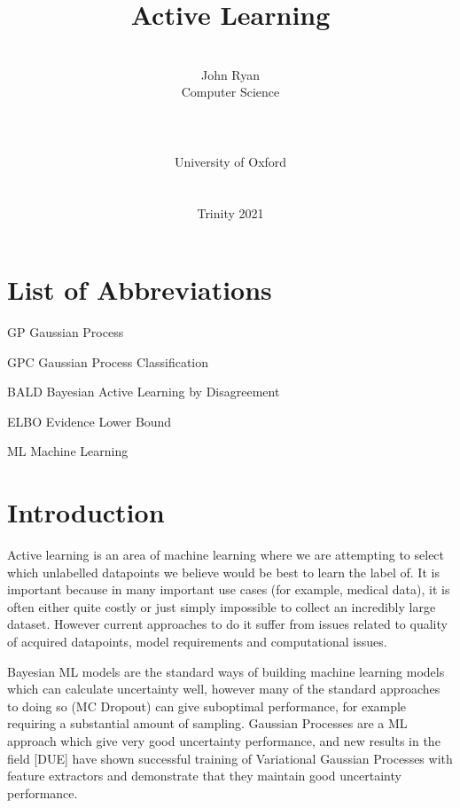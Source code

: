 \documentclass[12pt, a4paper]{report}
\date{}
\title{Active Learning}
\author{\\ \Large{John Ryan}
\\ Computer Science
\\
\\
\\
\\ University of Oxford
\\
\\ \\
Trinity 2021
}
\theoremstyle{definition}
\theoremstyle{definition}
\theoremstyle{definition}
\begin{document}

\thispagestyle{headings}
	\maketitle
\FloatBarrier
{}


\thispagestyle{empty}
\begin{abstract}



\end{abstract}
\tableofcontents
\thispagestyle{plain}
\listoffigures
\listoftables
\listofalgocfs
\listoftheorems
\chapter*{List of Abbreviations}
\begin{abbreviations}
    \item[GP] Gaussian Process
    \item[GPC] Gaussian Process Classification
    \item[BALD] Bayesian Active Learning by Disagreement
    \item[ELBO] Evidence Lower Bound
    \item[ML] Machine Learning
\end{abbreviations}

\chapter{Introduction}

Active learning is an area of machine learning where we are attempting to select which unlabelled datapoints we believe would be best to learn the label of. It is important because in many important use cases (for example, medical data), it is often either quite costly or just simply impossible to collect an incredibly large dataset. However current approaches to do it suffer from issues related to quality of acquired datapoints, model requirements and computational issues.

Bayesian ML models are the standard ways of building machine learning models which can calculate uncertainty well, however many of the standard approaches to doing so (MC Dropout) can give suboptimal performance, for example requiring a substantial amount of sampling. Gaussian Processes are a ML approach which give very good uncertainty performance, and new results in the field [DUE] have shown successful training of Variational Gaussian Processes with feature extractors and demonstrate that they maintain good uncertainty performance.
\end{document}
